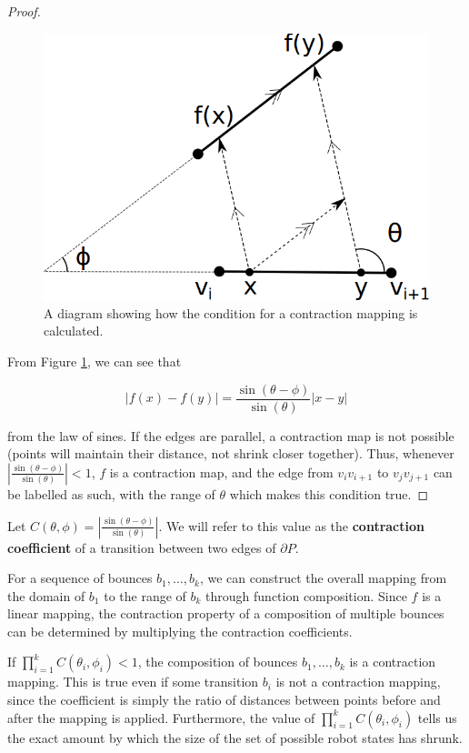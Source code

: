 \documentclass[]{svproc}  %
\begin{document}
\begin{proof}

\begin{figure}
    \includegraphics[width=0.5\linewidth]{figures/contraction_map_cond.png}
    \centering
    \caption{A diagram showing how the condition for a contraction mapping is
calculated. \label{fig:cont_map}}
    \centering
\end{figure}

From Figure \ref{fig:cont_map}, we can see that

\begin{equation*}
|f(x) - f(y)| = \frac{\sin(\theta - \phi)}{\sin(\theta)} |x-y|
\end{equation*}

from the law of sines. If the edges are parallel, a
contraction map is not possible (points will maintain their distance, not shrink
closer together). Thus, whenever $| \frac{\sin(\theta - \phi)}{\sin(\theta)}
| < 1$, $f$ is a contraction map, and the edge from $v_i v_{i+1}$ to $v_j
v_{j+1}$ can be labelled as such, with the range of $\theta$ which makes this
condition true.

\end{proof}

\begin{definition}
Let $C(\theta, \phi) = | \frac{\sin(\theta - \phi)}{\sin(\theta)} |$. We will
refer to this value as the \textbf{contraction coefficient} of a transition between two
edges of $\partial P$.
\end{definition}

For a sequence of bounces $b_1, \ldots, b_k$, we can construct the overall
mapping from the domain of $b_1$ to the range of $b_k$ through function
composition. Since $f$ is a linear mapping, the contraction property of a composition 
of multiple bounces can be determined by multiplying the contraction
coefficients.

If $\prod_{i=1}^k C(\theta_i, \phi_i) < 1$, the composition of bounces $b_1, \ldots, b_k$
is a contraction mapping. This is true even if some transition $b_i$ is not a
contraction mapping, since the coefficient is simply the ratio of distances
between points before and after the mapping is applied. Furthermore, the value
of $\prod_{i=1}^k C(\theta_i, \phi_i)$ tells us the exact amount by which the
size of the set of possible robot states has shrunk.
\end{document}
